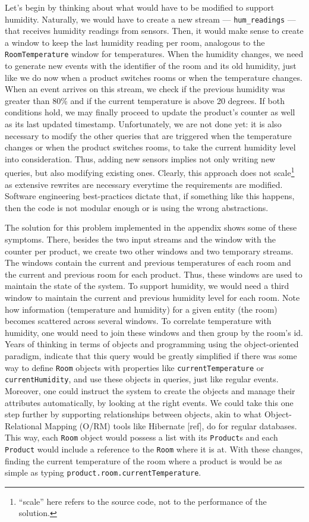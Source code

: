 \documentclass{report}
\begin{document}
Let's begin by thinking about what would have to be modified to
support humidity. Naturally, we would have to create a new stream ---
\verb=hum_readings= --- that receives humidity readings from
sensors. Then, it would make sense to create a window to keep the last
humidity reading per room, analogous to the \verb=RoomTemperature=
window for temperatures. When the humidity changes, we need to
generate new events with the identifier of the room and its old
humidity, just like we do now when a product switches rooms or when
the temperature changes. When an event arrives on this stream, we
check if the previous humidity was greater than 80\% and if the
current temperature is above 20 degrees. If both conditions hold, we
may finally proceed to update the product's counter as well as its
last updated timestamp. Unfortunately, we are not done yet: it is also
necessary to modify the other queries that are triggered when the
temperature changes or when the product switches rooms, to take the
current humidity level into consideration. Thus, adding new sensors
implies not only writing new queries, but also modifying existing
ones. Clearly, this approach does not scale\footnote{``scale'' here
  refers to the source code, not to the performance of the solution.}
as extensive rewrites are necessary everytime the requirements are
modified. Software engineering best-practices dictate that, if
something like this happens, then the code is not modular enough or is
using the wrong abstractions.

The solution for this problem implemented in the appendix shows some
of these symptoms. There, besides the two input streams and the window
with the counter per product, we create two other windows and two
temporary streams. The windows contain the current and previous
temperatures of each room and the current and previous room for each
product. Thus, these windows are used to maintain the state of the
system. To support humidity, we would need a third window to maintain
the current and previous humidity level for each room. Note how
information (temperature and humidity) for a given entity (the room)
becomes scattered across several windows. To correlate temperature
with humidity, one would need to join these windows and then group by
the room's id. Years of thinking in terms of objects and programming
using the object-oriented paradigm, indicate that this query would be
greatly simplified if there was some way to define \verb=Room= objects
with properties like \verb=currentTemperature= or
\verb=currentHumidity=, and use these objects in queries, just like
regular events. Moreover, one could instruct the system to create the
objects and manage their attributes automatically, by looking at the
right events. We could take this one step further by supporting
relationships between objects, akin to what Object-Relational Mapping
(O/RM) tools like Hibernate [ref], do for regular databases. This way,
each \verb=Room= object would possess a list with its \verb=Product=s
and each \verb=Product= would include a reference to the \verb=Room=
where it is at. With these changes, finding the current temperature of
the room where a product is would be as simple as typing
\verb=product.room.currentTemperature=.
\end{document}

